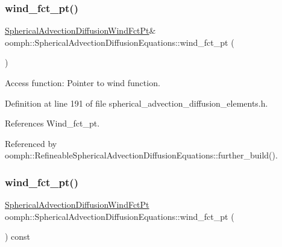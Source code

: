 \mbox{\label{classoomph_1_1SphericalAdvectionDiffusionEquations_ae3d7908aae79d3eae5ba6e1bb638498b}} 
\subsubsection{\texorpdfstring{wind\+\_\+fct\+\_\+pt()}{wind\_fct\_pt()}\hspace{0.1cm}{\footnotesize\ttfamily [1/2]}}
{\footnotesize\ttfamily \hyperlink{classoomph_1_1SphericalAdvectionDiffusionEquations_adef9c036e9f80c134078d8d78049199e}{Spherical\+Advection\+Diffusion\+Wind\+Fct\+Pt}\& oomph\+::\+Spherical\+Advection\+Diffusion\+Equations\+::wind\+\_\+fct\+\_\+pt (\begin{DoxyParamCaption}{ }\end{DoxyParamCaption})\hspace{0.3cm}{\ttfamily [inline]}}



Access function\+: Pointer to wind function. 



Definition at line 191 of file spherical\+\_\+advection\+\_\+diffusion\+\_\+elements.\+h.



References Wind\+\_\+fct\+\_\+pt.



Referenced by oomph\+::\+Refineable\+Spherical\+Advection\+Diffusion\+Equations\+::further\+\_\+build().

\mbox{\label{classoomph_1_1SphericalAdvectionDiffusionEquations_a143f3e3ec0e1ac832b957635ce5c58f0}} 
\subsubsection{\texorpdfstring{wind\+\_\+fct\+\_\+pt()}{wind\_fct\_pt()}\hspace{0.1cm}{\footnotesize\ttfamily [2/2]}}
{\footnotesize\ttfamily \hyperlink{classoomph_1_1SphericalAdvectionDiffusionEquations_adef9c036e9f80c134078d8d78049199e}{Spherical\+Advection\+Diffusion\+Wind\+Fct\+Pt} oomph\+::\+Spherical\+Advection\+Diffusion\+Equations\+::wind\+\_\+fct\+\_\+pt (\begin{DoxyParamCaption}{ }\end{DoxyParamCaption}) const\hspace{0.3cm}{\ttfamily [inline]}}



